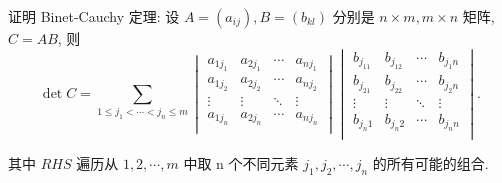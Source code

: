 \documentclass{ctexart}
\begin{document}
\begin{exercise}\label{ex3.6}
    证明 Binet-Cauchy 定理: 设 $A=(a_{ij}),B=(b_{kl})$ 分别是 $n\times m,m\times n$ 矩阵, $C=AB$, 则
    \[\det C=\sum\limits_{1\leq j_1<\cdots<j_n\leq m}\begin{vmatrix}
        a_{1j_1} & a_{2j_1} & \cdots & a_{nj_1} \\
        a_{1j_2} & a_{2j_2} & \cdots & a_{nj_2} \\
        \vdots & \vdots & \ddots & \vdots \\
        a_{1j_n} & a_{2j_n} & \cdots & a_{nj_n} \\
    \end{vmatrix}\begin{vmatrix}
        b_{j_11} & b_{j_12} & \cdots & b_{j_1n} \\
        b_{j_21} & b_{j_22} & \cdots & b_{j_2n} \\
        \vdots & \vdots & \ddots & \vdots \\
        b_{j_n1} & b_{j_n2} & \cdots & b_{j_nn} \\
    \end{vmatrix}.\]

    其中 $RHS$ 遍历从 $1,2,\cdots,m$ 中取 n 个不同元素 $j_1,j_2,\cdots,j_n$ 的所有可能的组合.
\end{exercise}
\end{document}
